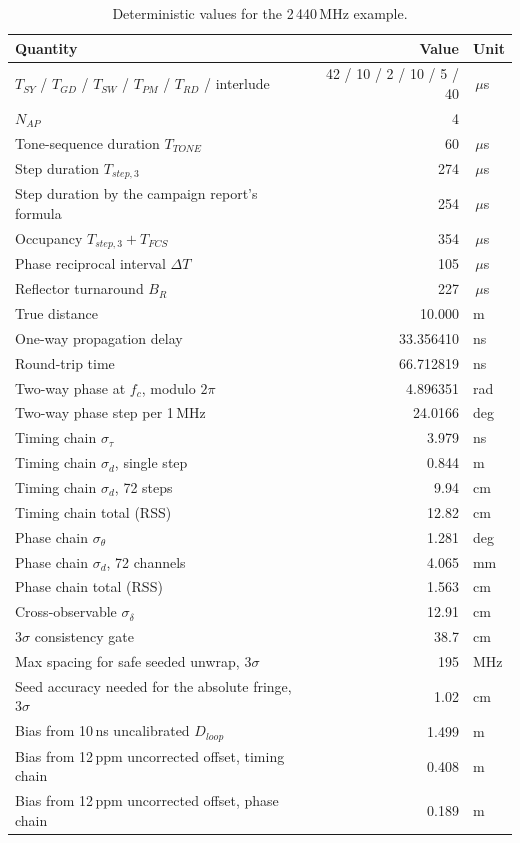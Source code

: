 \documentclass[11pt,a4paper]{article}
\newcommand{\us}{\,\ensuremath{\upmu}s}
\newcommand{\Tsy}{T_{SY}}
\newcommand{\Tgd}{T_{GD}}
\newcommand{\Ttone}{T_{TONE}}
\newcommand{\Tsw}{T_{SW}}
\newcommand{\Tpm}{T_{PM}}
\newcommand{\Trd}{T_{RD}}
\newcommand{\Nap}{N_{AP}}
\providecommand{\upmu}{\mu}
\begin{document}
\begin{table}[h]
\caption{Deterministic values for the 2\,440\,MHz example.}
\label{tab:exvalues}
\centering\small
\begin{tabular}{@{}L{62mm}rl@{}}
\toprule
Quantity & Value & Unit \\
\midrule
$\Tsy$ / $\Tgd$ / $\Tsw$ / $\Tpm$ / $\Trd$ / interlude & 42 / 10 / 2 / 10 / 5 / 40 & \us \\
$\Nap$ & 4 & \\
Tone-sequence duration $\Ttone$ & 60 & \us \\
Step duration $T_{step,3}$ & 274 & \us \\
Step duration by the campaign report's formula & 254 & \us \\
Occupancy $T_{step,3}+T_{FCS}$ & 354 & \us \\
Phase reciprocal interval $\Delta T$ & 105 & \us \\
Reflector turnaround $B_R$ & 227 & \us \\
True distance & 10.000 & m \\
One-way propagation delay & 33.356410 & ns \\
Round-trip time & 66.712819 & ns \\
Two-way phase at $f_c$, modulo $2\pi$ & 4.896351 & rad \\
Two-way phase step per 1\,MHz & 24.0166 & deg \\
Timing chain $\sigma_\tau$ & 3.979 & ns \\
Timing chain $\sigma_d$, single step & 0.844 & m \\
Timing chain $\sigma_d$, 72 steps & 9.94 & cm \\
Timing chain total (RSS) & 12.82 & cm \\
Phase chain $\sigma_\theta$ & 1.281 & deg \\
Phase chain $\sigma_d$, 72 channels & 4.065 & mm \\
Phase chain total (RSS) & 1.563 & cm \\
Cross-observable $\sigma_\delta$ & 12.91 & cm \\
$3\sigma$ consistency gate & 38.7 & cm \\
Max spacing for safe seeded unwrap, $3\sigma$ & 195 & MHz \\
Seed accuracy needed for the absolute fringe, $3\sigma$ & 1.02 & cm \\
Bias from 10\,ns uncalibrated $D_{loop}$ & 1.499 & m \\
Bias from 12\,ppm uncorrected offset, timing chain & 0.408 & m \\
Bias from 12\,ppm uncorrected offset, phase chain & 0.189 & m \\
\bottomrule
\end{tabular}
\end{table}
\end{document}
